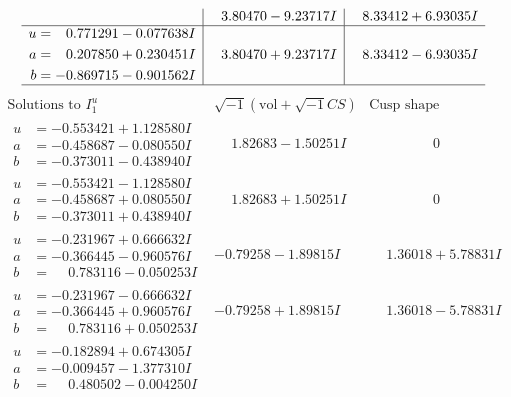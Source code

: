 \documentclass[1p]{elsarticle_modified}
\theoremstyle{definition}
\newcommand{\I}{\sqrt{-1}}
\begin{document}
$$\begin{array}{c|c|c}
 & \phantom{-}3.80470 - 9.23717 I & \phantom{-}8.33412 + 6.93035 I \\ \hline\begin{aligned}
u &= \phantom{-}0.771291 - 0.077638 I \\
a &= \phantom{-}0.207850 + 0.230451 I \\
b &= -0.869715 - 0.901562 I\end{aligned}
 & \phantom{-}3.80470 + 9.23717 I & \phantom{-}8.33412 - 6.93035 I\\
 \hline 
 \end{array}$$\newpage$$\begin{array}{c|c|c}  
\text{Solutions to }I^u_{1}& \I (\text{vol} + \sqrt{-1}CS) & \text{Cusp shape}\\
 \hline 
\begin{aligned}
u &= -0.553421 + 1.128580 I \\
a &= -0.458687 - 0.080550 I \\
b &= -0.373011 - 0.438940 I\end{aligned}
 & \phantom{-}1.82683 - 1.50251 I & \phantom{-0.000000 } 0 \\ \hline\begin{aligned}
u &= -0.553421 - 1.128580 I \\
a &= -0.458687 + 0.080550 I \\
b &= -0.373011 + 0.438940 I\end{aligned}
 & \phantom{-}1.82683 + 1.50251 I & \phantom{-0.000000 } 0 \\ \hline\begin{aligned}
u &= -0.231967 + 0.666632 I \\
a &= -0.366445 - 0.960576 I \\
b &= \phantom{-}0.783116 - 0.050253 I\end{aligned}
 & -0.79258 - 1.89815 I & \phantom{-}1.36018 + 5.78831 I \\ \hline\begin{aligned}
u &= -0.231967 - 0.666632 I \\
a &= -0.366445 + 0.960576 I \\
b &= \phantom{-}0.783116 + 0.050253 I\end{aligned}
 & -0.79258 + 1.89815 I & \phantom{-}1.36018 - 5.78831 I \\ \hline\begin{aligned}
u &= -0.182894 + 0.674305 I \\
a &= -0.009457 - 1.377310 I \\
b &= \phantom{-}0.480502 - 0.004250 I\end{aligned}

\end{array}$$
\end{document}
